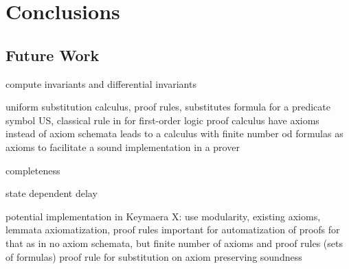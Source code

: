 \chapter{Conclusions}
    \section{Future Work}
    	compute invariants and differential invariants

    	uniform substitution calculus, proof rules, substitutes formula for a predicate symbol
    	US, classical rule in for first-order logic proof calculus
    	have axioms instead of axiom schemata
    	leads to a calculus with finite number od \ddL formulas as axioms
    	to facilitate a sound implementation in a prover

        completeness

    	state dependent delay

    potential implementation in Keymaera X: use modularity, existing axioms, lemmata
    axiomatization, proof rules important for automatization of proofs
    for that as \dL in \cite{Platzer15Uniform} no axiom schemata, but finite number of axioms and proof rules (sets of formulas)
proof rule for substitution on axiom preserving soundness
